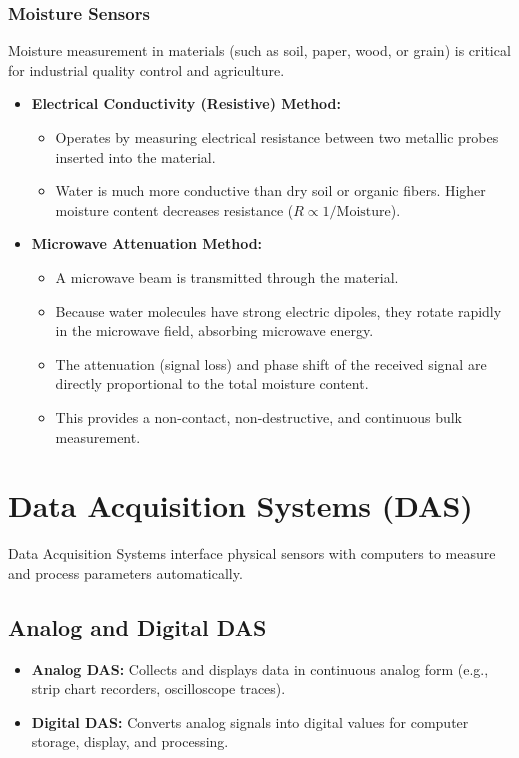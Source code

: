 \documentclass[12pt,a4paper]{article}
\begin{document}
\subsubsection{Moisture Sensors}
Moisture measurement in materials (such as soil, paper, wood, or grain) is critical for industrial quality control and agriculture.
\begin{itemize}[leftmargin=*, itemsep=3.5pt]
  \item \textbf{Electrical Conductivity (Resistive) Method:}
    \begin{itemize}[leftmargin=*, itemsep=2.5pt, topsep=0pt]
      \item Operates by measuring electrical resistance between two metallic probes inserted into the material.
      \item Water is much more conductive than dry soil or organic fibers. Higher moisture content decreases resistance ($R \propto 1/\text{Moisture}$).
    \end{itemize}
  \item \textbf{Microwave Attenuation Method:}
    \begin{itemize}[leftmargin=*, itemsep=2.5pt, topsep=0pt]
      \item A microwave beam is transmitted through the material.
      \item Because water molecules have strong electric dipoles, they rotate rapidly in the microwave field, absorbing microwave energy.
      \item The attenuation (signal loss) and phase shift of the received signal are directly proportional to the total moisture content.
      \item This provides a non-contact, non-destructive, and continuous bulk measurement.
    \end{itemize}
\end{itemize}

\section{Data Acquisition Systems (DAS)}

Data Acquisition Systems interface physical sensors with computers to measure and process parameters automatically.

\subsection{Analog and Digital DAS}
\begin{itemize}[leftmargin=*, itemsep=3.5pt]
  \item \textbf{Analog DAS:} Collects and displays data in continuous analog form (e.g., strip chart recorders, oscilloscope traces).
  \item \textbf{Digital DAS:} Converts analog signals into digital values for computer storage, display, and processing.
\end{itemize}
\end{document}
